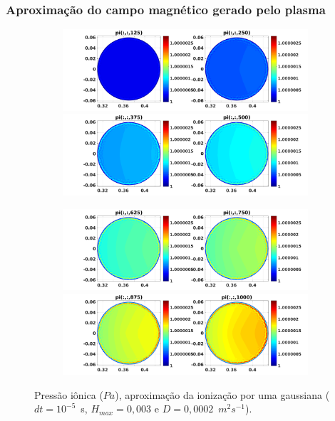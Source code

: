 \documentclass[aspectratio=169]{beamer}
\begin{document}
\begin{frame}		
\frametitle{ Aproximação do campo magnético gerado pelo plasma}
\begin{figure}[H]
\begin{subfigure}{0.43\textwidth}
\includegraphics[scale=0.24]{../SImulacao_breakdown/PDE/pitod1B8.png}  
\includegraphics[scale=0.24]{../SImulacao_breakdown/PDE/pitod2B8.png} 
\end{subfigure}
\begin{subfigure}{0.43\textwidth}
\includegraphics[scale=0.24]{../SImulacao_breakdown/PDE/pitod3B8.png} 
\includegraphics[scale=0.24]{../SImulacao_breakdown/PDE/pitod4B8.png} 
\end{subfigure}
\caption{Pressão iônica ($Pa$), aproximação da ionização por uma gaussiana ($dt=10^{-5}$\ s, $H_{max} = 0,003$ e $D=0,0002$\ $m^2s^{-1}$).}
\end{figure}

\end{frame}
\end{document}
